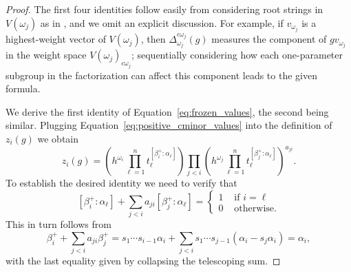 \documentclass[12pt]{amsart}
\newcommand{\cvar}{z}
\theoremstyle{remark}
\numberwithin{equation}{section}
\numberwithin{figure}{section}
\begin{document}
\begin{proof}
  The first four identities follow easily from considering root strings in $V(\omega_j)$ as in \cite[Proof of Equation 3.20]{YZ08}, and we omit an explicit discussion.
  For example, if $v_{\omega_j}$ is a highest-weight vector of $V(\omega_j)$, then $\Delta^{c\omega_j}_{\omega_j}(g)$ measures the component of $gv_{\omega_j}$ in the weight space $V(\omega_j)_{c \omega_j}$; sequentially considering how each one-parameter subgroup in the factorization can affect this component leads to the given formula.

  We derive the first identity of Equation~\eqref{eq:frozen_values}, the second being similar.
  Plugging Equation~\eqref{eq:positive_cminor_values} into the definition of $\cvar_i(g)$ we obtain
  \[
    \cvar_i(g)
    =
    \left(h^{\omega_i}\prod_{\ell =1}^n t_{\ell}^{[\beta_i^+:\alpha_\ell]}\right)
    \prod_{j<i}\left(h^{\omega_j}\prod_{\ell=1}^n t_{\ell}^{[\beta_j^+:\alpha_\ell]}\right)^{a_{ji}}.
  \]
  To establish the desired identity we need to verify that
  \[
    [\beta_i^+:\alpha_\ell]+\sum_{j<i}a_{ji}[\beta_j^+:\alpha_\ell]
    =
    \begin{cases}
      1 & \text{ if $i=\ell$}\\
      0 & \text{ otherwise.}
    \end{cases}
  \]
  This in turn follows from
  \begin{equation}
    \label{eq:alpha_to_beta}
    \beta_i^++\sum_{j<i}a_{ji}\beta_j^+ = s_1\cdots s_{i-1}\alpha_i + \sum_{j<i}s_1\cdots s_{j-1}(\alpha_i - s_j\alpha_i)
    =
    \alpha_i,
  \end{equation}
  with the last equality given by collapsing the telescoping sum.
\end{proof}
\end{document}
